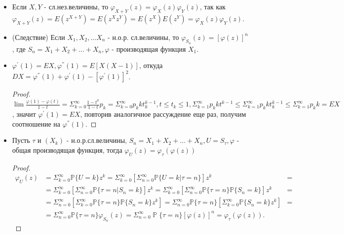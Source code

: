 \documentclass[a4paper,100pt]{article}
\theoremstyle{indented}
\theoremstyle{definition}
\theoremstyle{remark}
\DeclareMathOperator{\PP}{\mathbb{P}}
\begin{document}
\begin{itemize}
     \item Если $X,Y$ - сл.нез.величины, то $\varphi_{X+Y}(z) = \varphi_X(z) \varphi_Y(z)$, так как $\varphi_{X+Y}(z) = E(z^{X+Y})=E(z^X z^Y)=E(z^X) E(z^Y)=\varphi_X(z)\varphi_Y(z)$.
     
     \item (Следствие) Если $X_1,X_2,...X_n$ - н.о.р. сл.величины, то $\varphi_{S_n}(z) = [\varphi(z)]^n$, где $S_n = X_1 + X_2 + ... + X_n, \varphi$ - производящая функция $X_1$.
     
     \item $\varphi^{'}(1) = EX, \varphi^{''}(1) = E[X(X-1)]$, откуда $DX = \varphi^{''}(1) + \varphi^{'}(1) - [\varphi^{'}(1)]^2$.
     
     \begin{proof}
         $\lim\frac{\varphi(1)-\varphi(t)}{1-t}=\Sigma_{k=0}^{\infty}\frac{1-t^k}{1-t}p_k=\Sigma_{k=0}^{\infty}p_k k t_k^{k-1},t \leq t_k \leq 1, \Sigma_{k=1}^{\infty}p_k k t^{k-1} \leq \Sigma_{k=1}^{\infty}p_k k t_k^{k-1} \leq \Sigma_{k=1}^{\infty}p_k k = EX$, значит $\varphi^{'}(1) = EX$, повторив аналогичное рассуждение еще раз, получим соотношение на $\varphi^{''}(1)$.
     \end{proof}
     
     \item Пусть $\tau$ и $(X_k)$ - н.о.р.сл.величины, $S_n = X_1 + X_2 + ... + X_n, U = S_{\tau}, \varphi$ - общая производящая функция, тогда $\varphi_{U}(z) = \varphi_{\tau}(\varphi(z))$
     
     \begin{proof}
     \begin{equation*}
     \begin{aligned}
        \varphi_U(z) &= \Sigma_{k=0}^{\infty}\mathbb P \{U = k\} z^k = \Sigma_{k=0}^{\infty}[\Sigma_{n=0}^{\infty}\mathbb{P}\{U=k|\tau=n\}]z^k &= \\
        &= \Sigma_{k=0}^{\infty}[\Sigma_{n=0}^{\infty}\mathbb{P}\{\tau=n|S_n = k\}]z^k=\Sigma_{k=0}^{\infty}[\Sigma_{n=0}^{\infty}\mathbb{P}\{\tau=n\}\mathbb{P}\{S_n = 
            k\}]z^k &= \\
        &= \Sigma_{n=0}^{\infty}[\Sigma_{k=0}^{\infty}\mathbb{P}\{\tau=n\}\mathbb{P}\{S_n = k\}z^k]=\Sigma_{n=0}^{\infty}\mathbb{P}\{\tau=n\}[\Sigma_{k=0}^{\infty}\mathbb{P}\{S_n = k\}z^k] &= \\
        &= \Sigma_{n=0}^{\infty}\mathbb{P}\{\tau = n\}\varphi_{S_n}(z)=\Sigma_{n=0}^{\infty}\PP\{\tau=n\}[\varphi(z)]^n=\varphi_{\tau}(\varphi(z)).
     \end{aligned}    
     \end{equation*}
     \end{proof}
\end{itemize}
\end{document}
